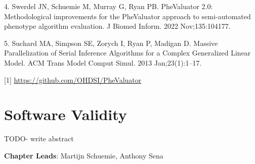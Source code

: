 \documentclass[
  letterpaper,
  paper=7in:10in,
  pagesize=pdftex,
  headinclude=on,
  footinclude=on,
  12pt]{scrbook}
\begin{document}
4. Swerdel JN, Schuemie M, Murray G, Ryan PB. PheValuator 2.0:
Methodological improvements for the PheValuator approach to
semi-automated phenotype algorithm evaluation. J Biomed Inform. 2022
Nov;135:104177.

5. Suchard MA, Simpson SE, Zorych I, Ryan P, Madigan D. Massive
Parallelization of Serial Inference Algorithms for a Complex Generalized
Linear Model. ACM Trans Model Comput Simul. 2013 Jan;23(1):1--17.

{[}1{]} \url{https://github.com/OHDSI/PheValuator}

\chapter{Software Validity}\label{sec-quality-software}

TODO- write abstract

\hfill\break

\textbf{Chapter Leads}: Martijn Schuemie, Anthony Sena
\end{document}
